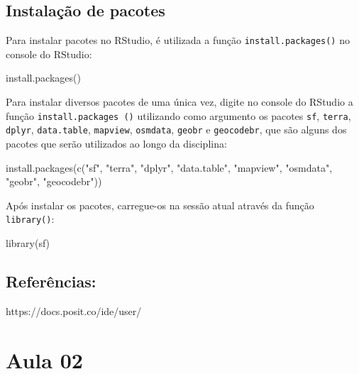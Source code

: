 \documentclass[
  letterpaper,
  DIV=11,
  numbers=noendperiod]{scrreprt}
\newenvironment{Shaded}{\begin{snugshade}}{\end{snugshade}}
\newcommand{\FunctionTok}[1]{\textcolor[rgb]{0.28,0.35,0.67}{#1}}
\newcommand{\NormalTok}[1]{\textcolor[rgb]{0.00,0.23,0.31}{#1}}
\newcommand{\StringTok}[1]{\textcolor[rgb]{0.13,0.47,0.30}{#1}}
\begin{document}
\section{Instalação de pacotes}\label{instalauxe7uxe3o-de-pacotes}

Para instalar pacotes no RStudio, é utilizada a função
\texttt{install.packages()} no console do RStudio:

\begin{Shaded}
\begin{Highlighting}[]
\FunctionTok{install.packages}\NormalTok{()}
\end{Highlighting}
\end{Shaded}

Para instalar diversos pacotes de uma única vez, digite no console do
RStudio a função \texttt{install.packages\ ()} utilizando como argumento
os pacotes \texttt{sf}, \texttt{terra}, \texttt{dplyr},
\texttt{data.table}, \texttt{mapview}, \texttt{osmdata}, \texttt{geobr}
e \texttt{geocodebr}, que são alguns dos pacotes que serão utilizados ao
longo da disciplina:

\begin{Shaded}
\begin{Highlighting}[]
\FunctionTok{install.packages}\NormalTok{(}\FunctionTok{c}\NormalTok{(}\StringTok{"sf"}\NormalTok{, }\StringTok{"terra"}\NormalTok{, }\StringTok{"dplyr"}\NormalTok{, }\StringTok{"data.table"}\NormalTok{, }\StringTok{"mapview"}\NormalTok{, }\StringTok{"osmdata"}\NormalTok{, }\StringTok{"geobr"}\NormalTok{, }\StringTok{"geocodebr"}\NormalTok{))}
\end{Highlighting}
\end{Shaded}

Após instalar os pacotes, carregue-os na sessão atual através da função
\texttt{library()}:

\begin{Shaded}
\begin{Highlighting}[]
\FunctionTok{library}\NormalTok{(sf)}
\end{Highlighting}
\end{Shaded}

\section{Referências:}\label{referuxeancias}

https://docs.posit.co/ide/user/


\chapter{Aula 02}\label{aula-02}
\end{document}
